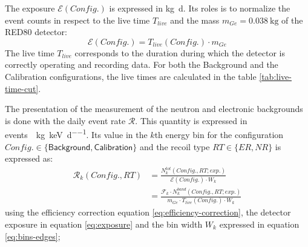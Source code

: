 
The exposure $\mathcal{E}(Config.)$ is expressed in \si{\kg \day}. Its roles is to normalize the event counts in respect to the live time $T_{live}$ and the mass $m_{Ge} = \SI{0.038}{\kg}$ of the RED80 detector:
\begin{equation}
\label{eq:exposure}
\mathcal{E}(Config.) = T_{live} (Config.) \cdot m_{Ge}
\end{equation}
The live time $T_{live}$ corresponds to the duration during which the detector is correctly operating and recording data. For both the Background and the Calibration configurations, the live times are calculated in the table \ref{tab:live-time-cut}.


The presentation of the measurement of the neutron and electronic backgrounds is done with the daily event rate $\mathcal{R}$. This quantity is expressed in \si{events \per \kg \per \kilo\eV \per \day}. Its value in the $k$th energy bin for the configuration $Config. \in \{ \textsf{Background}, \textsf{Calibration} \}$ and the recoil type $RT \in \{ ER, NR\}$ is expressed as:
\begin{align}
\mathcal{R}_k(Config., RT) 
&=
\frac{ N_k^{tot} (Config., RT; exp.) }{ \mathcal{E} (Config.) \cdot W_k}
\\
&=
\frac{ \mathcal{F}_k \cdot N_k^{band} (Config., RT; exp.) }{ m_{Ge} \cdot T_{live}(Config.) \cdot W_k}
\end{align}
using the efficiency correction equation \ref{eq:efficiency-correction}, the detector exposure in equation \ref{eq:exposure}
and the bin width $W_k$ expressed in equation \ref{eq:bins-edges};

